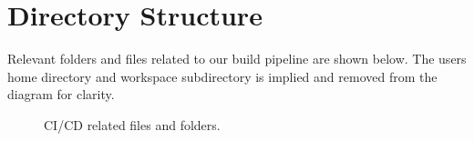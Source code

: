 \clearpage

\section{Directory Structure}

\justify{}
Relevant folders and files related to our build pipeline are shown below. The users
home directory
and workspace subdirectory is implied and removed from the diagram for clarity.

\begin{figure}[!htb]
	
	\caption{CI/CD related files and folders.}
\label{cicdfiles}
\end{figure}
